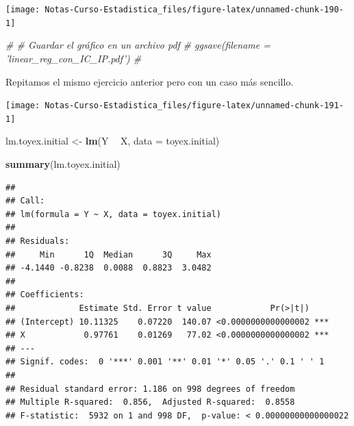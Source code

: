 \documentclass[
  12pt,
]{book}
\newenvironment{Shaded}{\begin{snugshade}}{\end{snugshade}}
\newcommand{\CommentTok}[1]{\textcolor[rgb]{0.56,0.35,0.01}{\textit{#1}}}
\newcommand{\DataTypeTok}[1]{\textcolor[rgb]{0.13,0.29,0.53}{#1}}
\newcommand{\DecValTok}[1]{\textcolor[rgb]{0.00,0.00,0.81}{#1}}
\newcommand{\KeywordTok}[1]{\textcolor[rgb]{0.13,0.29,0.53}{\textbf{#1}}}
\newcommand{\NormalTok}[1]{#1}
\newcommand{\OperatorTok}[1]{\textcolor[rgb]{0.81,0.36,0.00}{\textbf{#1}}}
\newcommand{\StringTok}[1]{\textcolor[rgb]{0.31,0.60,0.02}{#1}}
\theoremstyle{definition}
\theoremstyle{definition}
\theoremstyle{definition}
\theoremstyle{remark}
\begin{document}
\begin{center}\texttt{[image: Notas-Curso-Estadistica\_files/figure-latex/unnamed-chunk-190-1]} \end{center}

\begin{Shaded}
\begin{Highlighting}[]
\CommentTok{# # Guardar el gráfico en un archivo pdf}
\CommentTok{# ggsave(filename = 'linear_reg_con_IC_IP.pdf') #}
\end{Highlighting}
\end{Shaded}

Repitamos el mismo ejercicio anterior pero con un caso más sencillo.

\begin{Shaded}
\end{Shaded}

\begin{center}\texttt{[image: Notas-Curso-Estadistica\_files/figure-latex/unnamed-chunk-191-1]} \end{center}

\begin{Shaded}
\begin{Highlighting}[]
\NormalTok{lm.toyex.initial <-}\StringTok{ }\KeywordTok{lm}\NormalTok{(Y }\OperatorTok{~}\StringTok{ }\NormalTok{X, }\DataTypeTok{data =}\NormalTok{ toyex.initial)}

\KeywordTok{summary}\NormalTok{(lm.toyex.initial)}
\end{Highlighting}
\end{Shaded}

\begin{verbatim}
## 
## Call:
## lm(formula = Y ~ X, data = toyex.initial)
## 
## Residuals:
##     Min      1Q  Median      3Q     Max 
## -4.1440 -0.8238  0.0088  0.8823  3.0482 
## 
## Coefficients:
##             Estimate Std. Error t value            Pr(>|t|)    
## (Intercept) 10.11325    0.07220  140.07 <0.0000000000000002 ***
## X            0.97761    0.01269   77.02 <0.0000000000000002 ***
## ---
## Signif. codes:  0 '***' 0.001 '**' 0.01 '*' 0.05 '.' 0.1 ' ' 1
## 
## Residual standard error: 1.186 on 998 degrees of freedom
## Multiple R-squared:  0.856,  Adjusted R-squared:  0.8558 
## F-statistic:  5932 on 1 and 998 DF,  p-value: < 0.00000000000000022
\end{verbatim}
\end{document}
